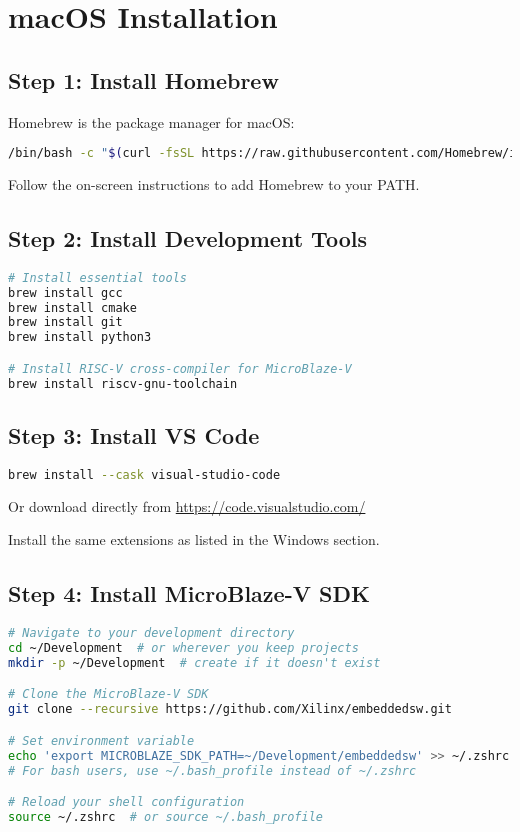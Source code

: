 \documentclass[11pt,a4paper]{article}
\begin{document}
\section{macOS Installation}

\subsection{Step 1: Install Homebrew}
Homebrew is the package manager for macOS:

\begin{lstlisting}[language=bash]
/bin/bash -c "$(curl -fsSL https://raw.githubusercontent.com/Homebrew/install/HEAD/install.sh)"
\end{lstlisting}

Follow the on-screen instructions to add Homebrew to your PATH.

\subsection{Step 2: Install Development Tools}
\begin{lstlisting}[language=bash]
# Install essential tools
brew install gcc
brew install cmake
brew install git
brew install python3

# Install RISC-V cross-compiler for MicroBlaze-V
brew install riscv-gnu-toolchain
\end{lstlisting}

\subsection{Step 3: Install VS Code}
\begin{lstlisting}[language=bash]
brew install --cask visual-studio-code
\end{lstlisting}

Or download directly from \url{https://code.visualstudio.com/}

Install the same extensions as listed in the Windows section.

\subsection{Step 4: Install MicroBlaze-V SDK}
\begin{lstlisting}[language=bash]
# Navigate to your development directory
cd ~/Development  # or wherever you keep projects
mkdir -p ~/Development  # create if it doesn't exist

# Clone the MicroBlaze-V SDK
git clone --recursive https://github.com/Xilinx/embeddedsw.git

# Set environment variable
echo 'export MICROBLAZE_SDK_PATH=~/Development/embeddedsw' >> ~/.zshrc
# For bash users, use ~/.bash_profile instead of ~/.zshrc

# Reload your shell configuration
source ~/.zshrc  # or source ~/.bash_profile
\end{lstlisting}
\end{document}
